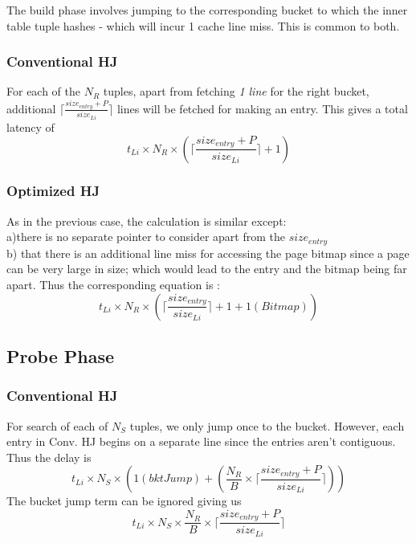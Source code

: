 \documentclass[10pt]{article}
\begin{document}
The build phase involves jumping to the corresponding bucket to which the inner table tuple hashes - which will incur 1 cache line miss. This is common to both. 
\subsubsection{Conventional HJ}
For each of the $N_R$ tuples, apart from fetching \emph{1 line} for the right bucket, additional $\lceil \frac {size_{entry} + P}{size_{Li}} \rceil$ lines will be fetched for making an entry. This gives a total latency of 
\begin{equation}
t_{Li} \times N_R\times (\lceil \frac {size_{entry} + P}{size_{Li}} \rceil + 1)
\end{equation}

\subsubsection{Optimized HJ}
As in the previous case, the calculation is similar except: \\
a)there is no separate pointer to consider apart from the $size_{entry}$\\
b) that there is an additional line miss for accessing the page bitmap since a page can be very large in size; which would lead to the entry and the bitmap being far apart. Thus the corresponding equation is : 
\begin{equation}
t_{Li} \times N_R\times (\lceil \frac {size_{entry}}{size_{Li}} \rceil + 1 + 1(Bitmap))
\end{equation}



\subsection{Probe Phase}

\subsubsection{Conventional HJ}
For search of each of $N_S$ tuples, we only jump once to the bucket. However, each entry in Conv. HJ begins on a separate line since the entries aren't contiguous. Thus the delay is 
\begin{equation}
t_{Li} \times N_S\times (1(bktJump) + (\frac{N_R}{B} \times \lceil \frac {size_{entry} + P}{size_{Li}} \rceil))
\end{equation}
The bucket jump term can be ignored giving us 
\begin{equation}
t_{Li} \times N_S\times \frac{N_R}{B} \times \lceil \frac {size_{entry} + P}{size_{Li}} \rceil
\end{equation}
\nonumber
\end{document}
